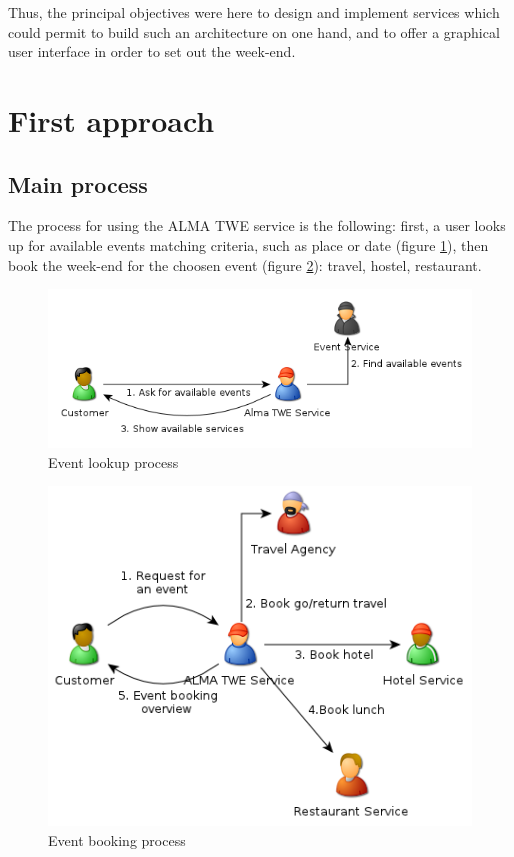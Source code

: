 \documentclass[a4paper]{article}
\begin{document}
		Thus, the principal objectives were here to design and implement services which could permit to build such an architecture on one hand, and to offer a graphical user interface in order to set out the week-end.

	\section{First approach}
	
		\subsection{Main process}
		
		
			The process for using the ALMA TWE service is the following: first, a user looks up for available events matching criteria, such as place or date (figure \ref{fig:lookup}), then book the week-end for the choosen event (figure \ref{fig:mainprocrequest}): travel, hostel, restaurant.
			
			\begin{figure}[htp]
				\centering
				\includegraphics[width=\textwidth]{lookupprocess.png}
				\caption{Event lookup process}
				\label{fig:lookup}
			\end{figure}
			
			\begin{figure}[htp]
				\centering
				\includegraphics[width=\textwidth]{bookingprocess.png}
				\caption{Event booking process}
				\label{fig:mainprocrequest}
			\end{figure}
			
\end{document}
